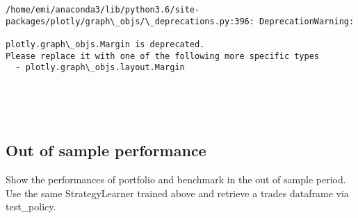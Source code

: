 \documentclass[11pt]{article}
\begin{document}
    \begin{Verbatim}[commandchars=\\\{\}]
/home/emi/anaconda3/lib/python3.6/site-packages/plotly/graph\_objs/\_deprecations.py:396: DeprecationWarning:

plotly.graph\_objs.Margin is deprecated.
Please replace it with one of the following more specific types
  - plotly.graph\_objs.layout.Margin



    \end{Verbatim}

    \begin{center}
    \end{center}
    { \hspace*{\fill} \\}
    
    \subsection{Out of sample performance}\label{out-of-sample-performance}

Show the performances of portfolio and benchmark in the out of sample
period. Use the same StrategyLearner trained above and retrieve a trades
dataframe via test\_policy.
\end{document}
